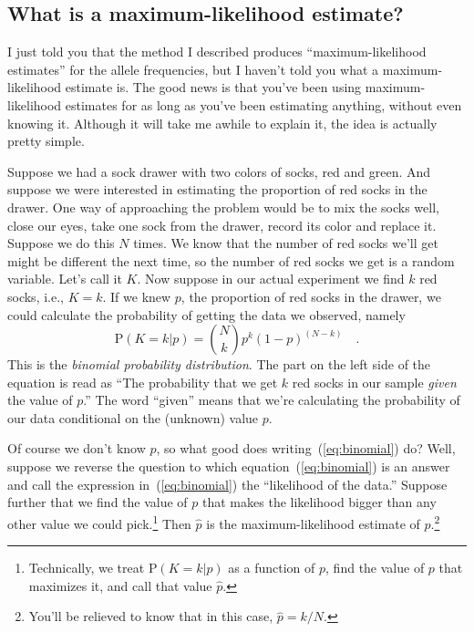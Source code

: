 \subsection*{What is a maximum-likelihood
  estimate?}

I just told you that the method I described produces
``maximum-likelihood estimates'' for the allele frequencies, but I
haven't told you what a maximum-likelihood estimate is. The good news
is that you've been using maximum-likelihood estimates for as long as
you've been estimating anything, without even knowing it. Although it
will take me awhile to explain it, the idea is actually pretty simple.

Suppose we had a sock drawer with two colors of socks, red and
green. And suppose we were interested in estimating the proportion of
red socks in the drawer. One way of approaching the problem would be
to mix the socks well, close our eyes, take one sock from the drawer,
record its color and replace it. Suppose we do this $N$ times. We know
that the number of red socks we'll get might be different the next
time, so the number of red socks we get is a random variable. Let's
call it $K$. Now suppose in our actual experiment we find $k$ red
socks, i.e., $K=k$. If we knew $p$, the proportion of red socks in the
drawer, we could calculate the probability of getting the data we
observed, namely
\begin{equation}
\mbox{P}(K=k|p) = {N \choose k} p^k (1-p)^{(N-k)} \quad . \label{eq:binomial}
\end{equation}
This is the {\it binomial probability distribution}. The part on the
left side of the equation is read as ``The probability that we get $k$
red socks in our sample {\it given\/} the value of $p$.'' The word
``given'' means that we're calculating the probability of our data
conditional on the (unknown) value $p$.

Of course we don't know $p$, so what good does
writing~(\ref{eq:binomial}) do? Well, suppose we reverse the question
to which equation~(\ref{eq:binomial}) is an answer and call the
expression in~(\ref{eq:binomial}) the ``likelihood of the data.''
Suppose further that we find the value of $p$ that makes the
likelihood bigger than any other value we could
pick.\footnote{Technically, we treat $\mbox{P}(K=k|p)$ as a function
  of $p$, find the value of $p$ that maximizes it, and call that value
  $\hat p$.} Then $\hat p$ is the maximum-likelihood estimate of
$p$.\footnote{You'll be relieved to know that in this case, $\hat p =
  k/N$.}

